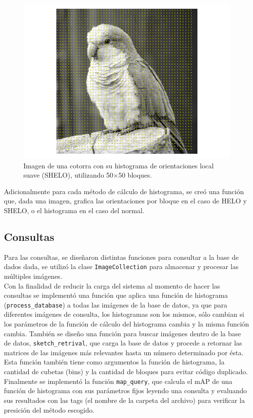 \documentclass[conference]{IEEEtran}
\begin{document}
	\begin{figure}[H]
    \centering
    \includegraphics[width=0.95\linewidth]{image/birb_shelo50.png}
\caption{Imagen de una cotorra con su histograma de orientaciones local suave (SHELO), utilizando 50$\times$50 bloques.}
\end{figure}	
	
    Adicionalmente para cada método de cálculo de histograma, se creó una función que, dada una imagen, grafica las orientaciones por bloque en el caso de HELO y SHELO, o el histograma en el caso del normal.

	
\subsection*{Consultas}
    Para las consultas, se diseñaron distintas funciones para consultar a la base de dados dada, se utilizó la clase \texttt{ImageCollection} para almacenar y procesar las múltiples imágenes. \\
    Con la finalidad de reducir la carga del sistema al momento de hacer las consultas se implementó una función que aplica una función de histograma (\texttt{process\_database}) a todas las imágenes de la base de datos, ya que para diferentes imágenes de consulta, los histogramas son los mismos, sólo cambian si los parámetros de la función de cálculo del histograma cambia y la misma función cambia.
    También se diseño una función para buscar imágenes dentro de la base de datos, \texttt{sketch\_retrival}, que carga la base de datos y procede a retornar las matrices de las imágenes más relevantes hasta un número determinado por ésta. Esta función también tiene como argumentos la función de histograma, la cantidad de cubetas (bins) y la cantidad de bloques para evitar código duplicado.
    Finalmente se implementó la función \texttt{map\_query}, que calcula el mAP de una función de histograma con sus parámetros fijos leyendo una consulta y evaluando sus resultados con las tags (el nombre de la carpeta del archivo) para verificar la presición del método escogido.
    
\end{document}
